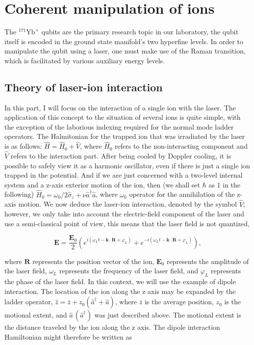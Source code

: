 \section{Coherent manipulation of ions}

The ${ }^{171} \mathrm{Yb}^{+}$ qubits are the primary research topic in our laboratory, the qubit itself is encoded in the ground state manifold's two hyperfine levels. In order to manipulate the qubit using a laser, one must make use of the Raman transition, which is facilitated by various auxiliary energy levels.

\subsection{Theory of laser-ion interaction}

In this part, I will focus on the interaction of a single ion with the laser. The application of this concept to the situation of several ions is quite simple, with the exception of the laborious indexing required for the normal mode ladder operators. The Halmitonian for the trapped ion that was irradiated by the laser is as follows: $\hat{H} = \hat{H}_0 + \hat{V}$, where $\hat{H}_0$ refers to the non-interacting component and $\hat{V}$ refers to the interaction part. After being cooled by Doppler cooling, it is possible to safely view it as a harmonic oscillator, even if there is just a single ion trapped in the potential. And if we are just concerned with a two-level internal system and a z-axis exterior motion of the ion, then (we shall set $\hbar$ as 1 in the following) $\hat{H}_0=\omega_0 /2 \hat{\sigma}_z + \nu \hat{a}^{\dagger} \hat{a}$, where $\omega_0$ operator for the annihilation of the z-axis motion. We now deduce the laser-ion interaction, denoted by the symbol $\hat{V}$; however, we only take into account the electric-field component of the laser and use a semi-classical point of view, this means that the laser field is not quantized,

\begin{equation}
    \mathbf{E}=\frac{\mathbf{E}_0}{2}\left(e^{i\left(\omega_L t-\mathbf{k} \cdot \mathbf{R}+\varphi_L\right)}+e^{-i\left(\omega_L t-\mathbf{k} \cdot \mathbf{R}+\varphi_L\right)}\right),
\end{equation}

where $\mathbf{R}$ represents the position vector of the ion, $\mathbf{E}_0$ represents the amplitude of the laser field, $\omega_L$ represents the frequency of the laser field, and $\varphi_L$ represents the phase of the laser field. In this context, we will use the example of dipole interaction. The location of the ion along the z axis may be expanded by the ladder operator, $\hat{z}=\bar{z} + z_0 (\hat{a}^{\dagger}+\hat{a})$, where $\bar{z}$ is the average position, $z_0$ is the motional extent, and $\hat{a}\, (\hat{a}^{\dagger})$ was just described above. The motional extent is the distance traveled by the ion along the z axis. The dipole interaction Hamiltonian might therefore be written as


